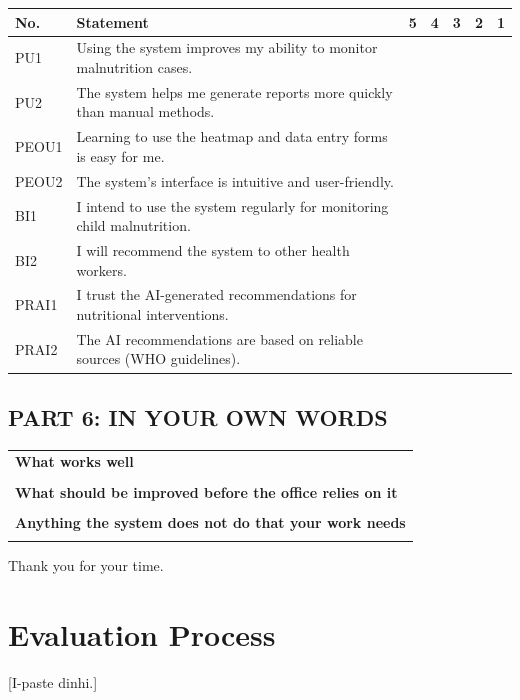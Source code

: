 \documentclass[12pt, a4paper]{report}
\begin{document}
\vspace{0.3cm}
\begin{tabular}{|p{1cm}|p{9cm}|p{0.7cm}|p{0.7cm}|p{0.7cm}|p{0.7cm}|p{0.7cm}|}
\hline
\textbf{No.} & \textbf{Statement} & \textbf{5} & \textbf{4} & \textbf{3} & \textbf{2} & \textbf{1} \\
\hline
PU1 & Using the system improves my ability to monitor malnutrition cases. & & & & & \\
\hline
PU2 & The system helps me generate reports more quickly than manual methods. & & & & & \\
\hline
PEOU1 & Learning to use the heatmap and data entry forms is easy for me. & & & & & \\
\hline
PEOU2 & The system's interface is intuitive and user-friendly. & & & & & \\
\hline
BI1 & I intend to use the system regularly for monitoring child malnutrition. & & & & & \\
\hline
BI2 & I will recommend the system to other health workers. & & & & & \\
\hline
PRAI1 & I trust the AI-generated recommendations for nutritional interventions. & & & & & \\
\hline
PRAI2 & The AI recommendations are based on reliable sources (WHO guidelines). & & & & & \\
\hline
\end{tabular}

\vspace{0.5cm}

\section*{PART 6: IN YOUR OWN WORDS}
\begin{tabular}{|p{15cm}|}
\hline
\textbf{What works well} \\
\vspace{1.5cm} \\
\hline
\textbf{What should be improved before the office relies on it} \\
\vspace{1.5cm} \\
\hline
\textbf{Anything the system does not do that your work needs} \\
\vspace{1.5cm} \\
\hline
\end{tabular}

\vspace{0.5cm}
\noindent Thank you for your time.

\restoregeometry
\clearpage

\chapter{Evaluation Process}
\label{app:evaluation}
[I-paste dinhi.]

\end{document}

